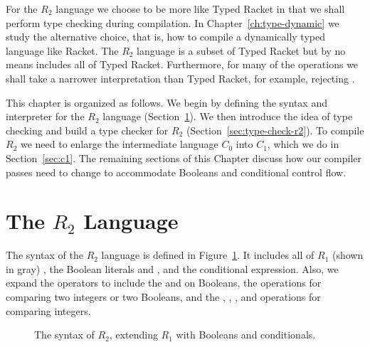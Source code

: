 \documentclass[11pt]{book}
\newcommand{\gray}[1]{{\color{lightgray} #1}}
\begin{document}
For the $R_2$ language we choose to be more like Typed Racket in that
we shall perform type checking during compilation. In
Chapter~\ref{ch:type-dynamic} we study the alternative choice, that
is, how to compile a dynamically typed language like Racket.  The
$R_2$ language is a subset of Typed Racket but by no means includes
all of Typed Racket. Furthermore, for many of the operations we shall
take a narrower interpretation than Typed Racket, for example,
rejecting .

This chapter is organized as follows.  We begin by defining the syntax
and interpreter for the $R_2$ language (Section~\ref{sec:r2-lang}). We
then introduce the idea of type checking and build a type checker for
$R_2$ (Section~\ref{sec:type-check-r2}). To compile $R_2$ we need to
enlarge the intermediate language $C_0$ into $C_1$, which we do in
Section~\ref{sec:c1}. The remaining sections of this Chapter discuss
how our compiler passes need to change to accommodate Booleans and
conditional control flow.


\section{The $R_2$ Language}
\label{sec:r2-lang}

The syntax of the $R_2$ language is defined in
Figure~\ref{fig:r2-syntax}. It includes all of $R_1$ (shown in gray) ,
the Boolean literals  and , and the conditional
 expression. Also, we expand the operators to include the
 and  on Booleans, the   operations for
comparing two integers or two Booleans, and the \key{<}, \key{<=},
\key{>}, and \key{>=} operations for comparing integers.

\begin{figure}[tp]
\centering
\fbox{
\begin{minipage}{0.96\textwidth}
\[
\begin{array}{lcl}
  \itm{cmp} &::= & \key{eq?} \mid \key{<} \mid \key{<=} \mid \key{>} \mid \key{>=} \\
  \Exp &::=& \gray{\Int \mid (\key{read}) \mid (\key{-}\;\Exp) \mid (\key{+} \; \Exp\;\Exp)}  \\
     &\mid&  \gray{\Var \mid \LET{\Var}{\Exp}{\Exp}} \\
     &\mid& \key{\#t} \mid \key{\#f} \mid
      (\key{and}\;\Exp\;\Exp) \mid (\key{not}\;\Exp) \\
      &\mid& (\itm{cmp}\;\Exp\;\Exp) \mid \IF{\Exp}{\Exp}{\Exp} \\
  R_2 &::=& (\key{program} \; \Exp)
\end{array}
\]
\end{minipage}
}
\caption{The syntax of $R_2$, extending $R_1$ with Booleans and
  conditionals.}
\label{fig:r2-syntax}
\end{figure}
\end{document}
